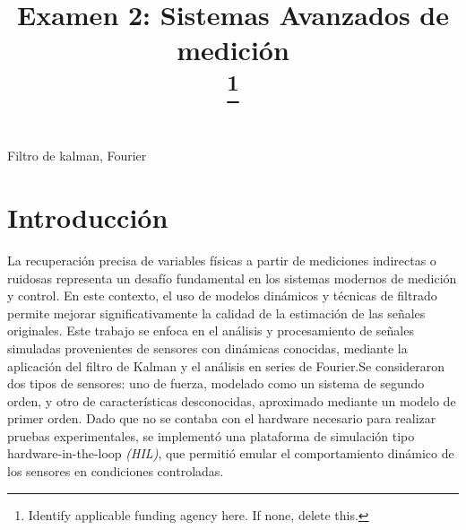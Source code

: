 \documentclass[conference]{IEEEtran}
\begin{document}
\title{Examen 2: Sistemas Avanzados de medici\'on\\
	\thanks{Identify applicable funding agency here. If none, delete this.}
}

\author{
	\and

}

\maketitle

\begin{IEEEkeywords}
	Filtro de kalman, Fourier
\end{IEEEkeywords}

\section{Introducción}

La recuperación precisa de variables físicas a partir de mediciones indirectas o ruidosas 
representa un desafío fundamental en los sistemas modernos de medición y control. En este 
contexto, el uso de modelos dinámicos y técnicas de filtrado permite mejorar significativamente 
la calidad de la estimación de las señales originales. Este trabajo se enfoca en el análisis 
y procesamiento de señales simuladas provenientes de sensores con dinámicas conocidas, 
mediante la aplicación del filtro de Kalman y el análisis en series de Fourier.Se consideraron
dos tipos de sensores: uno de fuerza, modelado como un sistema de segundo orden, y 
otro de características desconocidas, aproximado mediante un modelo de primer orden. 
Dado que no se contaba con el hardware necesario para realizar pruebas experimentales, 
se implementó una plataforma de simulación tipo hardware-in-the-loop \textit{(HIL)}, 
que permitió emular el comportamiento dinámico de los sensores en condiciones controladas.
\end{document}
